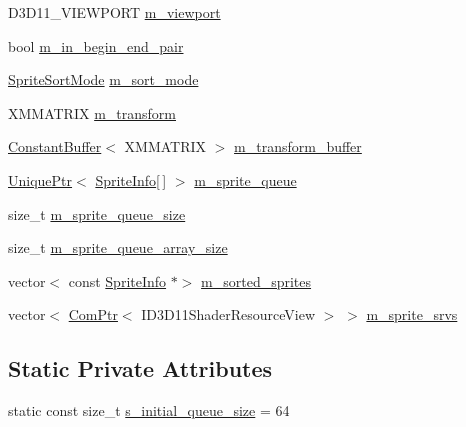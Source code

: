 \begin{DoxyCompactItemize}
D3\+D11\+\_\+\+V\+I\+E\+W\+P\+O\+RT \hyperlink{classmage_1_1_sprite_batch_a3029ab1ee01ccfc69fef88eb78d5bfc0}{m\+\_\+viewport}
\item 
bool \hyperlink{classmage_1_1_sprite_batch_a2f4e56ee07ef37a2906c552b0ea78403}{m\+\_\+in\+\_\+begin\+\_\+end\+\_\+pair}
\item 
\hyperlink{namespacemage_a256fa5833eecc408923de7ffadb5e014}{Sprite\+Sort\+Mode} \hyperlink{classmage_1_1_sprite_batch_a0b2b16b0d9eb63501b6fc0f9ce85e022}{m\+\_\+sort\+\_\+mode}
\item 
X\+M\+M\+A\+T\+R\+IX \hyperlink{classmage_1_1_sprite_batch_ad8a12f1f6c8289548346d469c9436c58}{m\+\_\+transform}
\item 
\hyperlink{structmage_1_1_constant_buffer}{Constant\+Buffer}$<$ X\+M\+M\+A\+T\+R\+IX $>$ \hyperlink{classmage_1_1_sprite_batch_ac8ff5a2d9956b4a33cb1f41310abf129}{m\+\_\+transform\+\_\+buffer}
\item 
\hyperlink{namespacemage_a3316d7143a973e37adf1110f2e80ca31}{Unique\+Ptr}$<$ \hyperlink{structmage_1_1_sprite_info}{Sprite\+Info}\mbox{[}$\,$\mbox{]} $>$ \hyperlink{classmage_1_1_sprite_batch_a67ab116e403b626771f03f527efa6f2f}{m\+\_\+sprite\+\_\+queue}
\item 
size\+\_\+t \hyperlink{classmage_1_1_sprite_batch_a0d7dadf01e3b905072c1aaa6b8e42c0e}{m\+\_\+sprite\+\_\+queue\+\_\+size}
\item 
size\+\_\+t \hyperlink{classmage_1_1_sprite_batch_a207760f2e11b1ea199529c65c9b21b3b}{m\+\_\+sprite\+\_\+queue\+\_\+array\+\_\+size}
\item 
vector$<$ const \hyperlink{structmage_1_1_sprite_info}{Sprite\+Info} $\ast$$>$ \hyperlink{classmage_1_1_sprite_batch_a65ad09d31c928ab1522d8b2c0c509b9a}{m\+\_\+sorted\+\_\+sprites}
\item 
vector$<$ \hyperlink{namespacemage_ae74f374780900893caa5555d1031fd79}{Com\+Ptr}$<$ I\+D3\+D11\+Shader\+Resource\+View $>$ $>$ \hyperlink{classmage_1_1_sprite_batch_adaad3bca737877db16bfa781563d8a93}{m\+\_\+sprite\+\_\+srvs}
\end{DoxyCompactItemize}
\subsection*{Static Private Attributes}
\begin{DoxyCompactItemize}
\item 
static const size\+\_\+t \hyperlink{classmage_1_1_sprite_batch_af649a6e9655bb8088d4c5d1e31281927}{s\+\_\+initial\+\_\+queue\+\_\+size} = 64
\end{DoxyCompactItemize}
